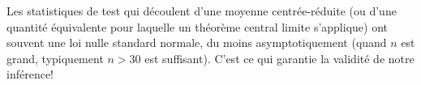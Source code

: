 \documentclass[
  11pt,
  letterpaper,
]{book}
\theoremstyle{definition}
\theoremstyle{definition}
\theoremstyle{definition}
\theoremstyle{remark}
\begin{document}
Les statistiques de test qui découlent d'une moyenne centrée-réduite (ou d'une quantité équivalente pour laquelle un théorème central limite s'applique) ont souvent une loi nulle standard normale, du moins asymptotiquement (quand \(n\) est grand, typiquement \(n>30\) est suffisant). C'est ce qui garantie la validité de notre inférence!

  
\end{document}
